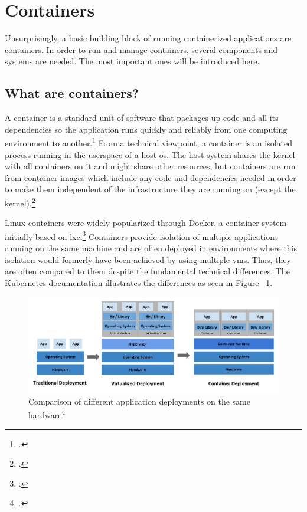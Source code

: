 \section{Containers}

Unsurprisingly, a basic building block of running containerized applications are containers.
In order to run and manage containers, several components and systems are needed. The most important ones will be introduced here.

\subsection{What are containers?}
A container is a standard unit of software that packages up code and all its dependencies so the application runs quickly and reliably from one computing environment to another.\footcite[][, section 'Package Software into Standardized Units for Development, Shipment and Deployment']{whatContainer}
From a technical viewpoint, a container is an isolated process running in the userspace of a host \gls{os}. The host system shares the kernel with all containers on it and might share other resources, but containers are run from container images which include any code and dependencies needed in order to make them independent of the infrastructure they are running on (except the kernel).\footcite[][, slide 13]{containerIntro}

Linux containers were widely popularized through Docker, a container system initially based on \gls{lxc}.\footcite[][, section '2013: Docker']{containerHistory}
Containers provide isolation of multiple applications running on the same machine and are often deployed in environments where this isolation would formerly have been achieved by using multiple \gls{vm}s. Thus, they are often compared to them despite the fundamental technical differences. The Kubernetes documentation illustrates the differences as seen in Figure ~\ref{fig:VMsVsContainers}.

\begin{figure}[H]
\includegraphics[scale=0.3]{pictures/VMsVsContainers.jpg} 
\caption{Comparison of different application deployments on the same hardware\protect\footcite[][, section 'Going back in time']{k8sBasics}}
\label{fig:VMsVsContainers}
\end{figure}

